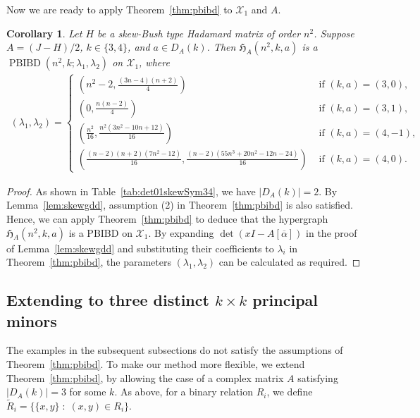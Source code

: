 \documentclass[11pt]{article}
\newtheorem{corollary}[theorem]{Corollary}
\begin{document}
 Now we are ready to apply Theorem~\ref{thm:pbibd} to $\mathcal X_1$ and $A$.

\begin{corollary}\label{cor:gdd}
Let $H$ be a skew-Bush type Hadamard matrix of order $n^2$.
Suppose $A=(J-H)/2$, $k\in\{3,4\}$, and $a\in D_A(k)$. 
Then $\mathfrak H_A(n^2,k,a)$ is a $\operatorname{PBIBD}(n^2,k;\lambda_1,\lambda_2)$ on $\mathcal X_1$, where
\begin{align*}
(\lambda_1,\lambda_2)=\begin{cases}
\left (n^2-2,\frac{(3n-4)(n+2)}{4} \right) & \text{ if }(k,a)=(3,0),\\
\left (0,\frac{n(n-2)}{4} \right) & \text{ if }(k,a)=(3,1),\\
\left (\frac{n^2}{16},\frac{n^2(3n^2-10n+12)}{16}\right ) & \text{ if }(k,a)=(4,-1),\\
\left (\frac{(n-2)(n+2)(7n^2-12)}{16},\frac{(n-2)(55n^3+20n^2-12n-24)}{16}\right ) & \text{ if }(k,a)=(4,0).
\end{cases}
\end{align*}
\end{corollary}
\begin{proof}
As shown in Table~\ref{tab:det01skewSym34}, we have $|D_A(k)| = 2$.
By Lemma~\ref{lem:skewgdd}, assumption (2) in Theorem~\ref{thm:pbibd} is also satisfied.
Hence, we can apply Theorem~\ref{thm:pbibd} to deduce that the hypergraph $\mathfrak H_A(n^2,k,a)$ is a PBIBD on $\mathcal X_1$. 
By expanding $\det(xI -A[\overline{\alpha}])$ in the proof of Lemma~\ref{lem:skewgdd} and substituting their coefficients to $\lambda_i$ in Theorem~\ref{thm:pbibd}, 
the parameters $(\lambda_1,\lambda_2)$ can be calculated as required. 
\end{proof}

\subsection{Extending to three distinct $k \times k$ principal minors}

The examples in the subsequent subsections do not satisfy the assumptions of Theorem~\ref{thm:pbibd}.
To make our method more flexible, we extend Theorem~\ref{thm:pbibd}, by allowing the case of a complex matrix $A$ satisfying $|D_A(k)|=3$ for some $k$.
As above, for a binary relation $R_i$, we define  $\tilde{R}_i=\{\{x,y\}  \; : \;  (x,y)\in R_i\}$.
\end{document}
